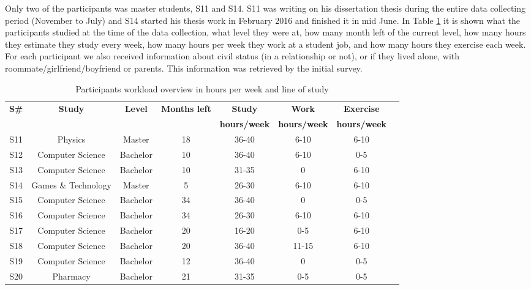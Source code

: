 \documentclass[12pt]{article} %
\begin{document}
Only two of the participants was master students, S11 and S14. S11 was writing on his dissertation thesis during the entire data collecting period (November to July) and S14 started his thesis work in February 2016 and finished it in mid June. In Table \ref{tab:part1v} it is shown what the participants studied at the time of the data collection, what level they were at, how many month left of the current level, how many hours they estimate they study every week, how many hours per week they work at a student job, and how many hours they exercise each week. For each participant we also received information about civil status (in a relationship or not), or if they lived alone, with roommate/girlfriend/boyfriend or parents. This information was retrieved by the initial survey.   

\begin{table}[H]
\center
\begin{footnotesize}
	\begin{tabular}{| c | c | c | c | c | c | c | c |}
	\hline
	\textbf{S\#} & \textbf{Study} & \textbf{Level} & \textbf{Months left} & \textbf{Study} & \textbf{Work} & \textbf{Exercise}\\
	 & & & & \textbf{hours/week} & \textbf{hours/week} & \textbf{hours/week}\\
	\hline
	S11 & Physics & Master & 18 & 36-40 & 6-10 & 6-10 \\
	\hline
	S12 & Computer Science & Bachelor & 10 & 36-40 & 6-10 & 0-5\\
	\hline
	S13 & Computer Science & Bachelor & 10 & 31-35 & 0 & 6-10\\
	\hline
	S14 & Games \& Technology & Master & 5 & 26-30 & 6-10 & 6-10\\
	\hline
	S15 & Computer Science & Bachelor & 34 & 36-40 & 0 & 0-5\\
	\hline
	S16 & Computer Science & Bachelor & 34 & 26-30 & 6-10 & 6-10\\
	\hline
	S17 & Computer Science & Bachelor & 20 & 16-20 & 0-5 & 6-10\\
	\hline
	S18 & Computer Science & Bachelor & 20 & 36-40 & 11-15 & 6-10\\
	\hline
	S19 & Computer Science & Bachelor & 12 & 36-40 & 0 & 0-5\\
	\hline
	S20 & Pharmacy & Bachelor & 21 & 31-35 & 0-5 & 0-5\\
	\hline
	\end{tabular}
	\caption{Participants workload overview in hours per week and line of study}
	\label{tab:part1v}
\end{footnotesize}
\end{table}
\end{document}
